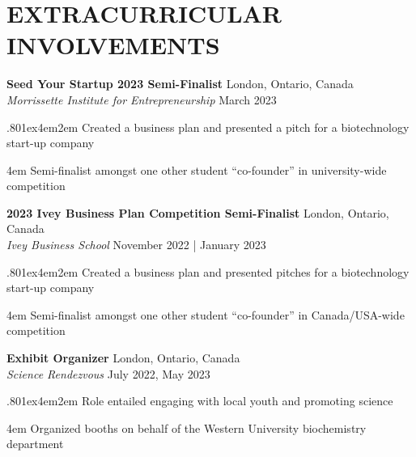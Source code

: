 \documentclass[a4paper,9pt]{extarticle}
\begin{document}
\section*{EXTRACURRICULAR INVOLVEMENTS}
\noindent
\begin{minipage}{1\textwidth}
\setlength{\parindent}{15pt} %
	\noindent
	\textbf{Seed Your Startup 2023 Semi-Finalist} \hfill London, Ontario, Canada\\ %
	\textit{Morrissette Institute for Entrepreneurship} \hfill March 2023  \par%
	{\hsize.80\linewidth\parskip1ex\hangindent4em\parindent2em 
	\setlength{\parskip}{0pt} %
		\indent Created a business plan and presented a pitch for a biotechnology start-up company \par
		\hangindent4em
		\indent Semi-finalist amongst one other student “co-founder” in university-wide competition \par}
\end{minipage}
\vspace{\parskip}

\noindent
\begin{minipage}{1\textwidth}
\setlength{\parindent}{15pt} %
	\noindent
	\textbf{2023 Ivey Business Plan Competition Semi-Finalist} \hfill London, Ontario, Canada\\ %
	\textit{Ivey Business School} \hfill November 2022 | January 2023  \par%
	{\hsize.80\linewidth\parskip1ex\hangindent4em\parindent2em 
	\setlength{\parskip}{0pt} %
		\indent Created a business plan and presented pitches for a biotechnology start-up company \par
		\hangindent4em
		\indent Semi-finalist amongst one other student “co-founder” in Canada/USA-wide competition \par}
\end{minipage}
\vspace{\parskip}

\noindent
\begin{minipage}{1\textwidth}
\setlength{\parindent}{15pt} %
	\noindent
	\textbf{Exhibit Organizer} \hfill London, Ontario, Canada\\ %
	\textit{Science Rendezvous} \hfill July 2022, May 2023  \par%
	{\hsize.80\linewidth\parskip1ex\hangindent4em\parindent2em 
	\setlength{\parskip}{0pt} %
		\indent Role entailed engaging with local youth and promoting science  \par
		\hangindent4em
		\indent Organized booths on behalf of the Western University biochemistry department \par}
\end{minipage}
\vspace{\parskip}
\end{document}
